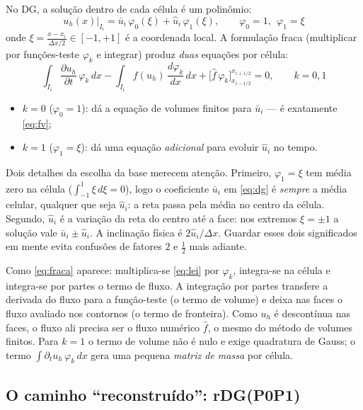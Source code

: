 \documentclass[10pt,a4paper]{article}
\newcommand{\pd}[2]{\frac{\partial #1}{\partial #2}}
\newcommand{\fh}{\hat f}
\newcommand{\ub}{\bar u}
\newcommand{\uh}{\hat u}
\begin{document}
No DG, a solução dentro de cada célula é um polinômio:
\begin{equation}\label{eq:dg}
u_h(x)\big|_{I_i}=\ub_i\,\varphi_0(\xi)+\uh_i\,\varphi_1(\xi),\qquad \varphi_0=1,\ \ \varphi_1=\xi
\end{equation}
onde $\xi=\frac{x-x_i}{\Delta x/2}\in[-1,+1]$ é a coordenada local. A formulação fraca (multiplicar por funções-teste $\varphi_k$ e integrar) produz \emph{duas} equações por célula:
\begin{equation}\label{eq:fraca}
\int_{I_i}\pd{u_h}{t}\,\varphi_k\,dx-\int_{I_i}f(u_h)\,\frac{d\varphi_k}{dx}\,dx+\Big[\fh\,\varphi_k\Big]_{x_{i-1/2}}^{x_{i+1/2}}=0,\qquad k=0,1
\end{equation}
\begin{itemize}[leftmargin=2.5em,itemsep=3pt]
\item $k=0$ ($\varphi_0=1$): dá a equação de volumes finitos para $\ub_i$ --- é exatamente \eqref{eq:fv};
\item $k=1$ ($\varphi_1=\xi$): dá uma equação \emph{adicional} para evoluir $\uh_i$ no tempo.
\end{itemize}

Dois detalhes da escolha da base merecem atenção. Primeiro, $\varphi_1=\xi$ tem média zero na célula ($\int_{-1}^{1}\xi\,d\xi=0$), logo o coeficiente $\ub_i$ em \eqref{eq:dg} é \emph{sempre} a média celular, qualquer que seja $\uh_i$: a reta passa pela média no centro da célula. Segundo, $\uh_i$ é a variação da reta do centro até a face: nos extremos $\xi=\pm1$ a solução vale $\ub_i\pm\uh_i$. A inclinação física é $2\uh_i/\Delta x$. Guardar esses dois significados em mente evita confusões de fatores $2$ e $\tfrac12$ mais adiante.

Como \eqref{eq:fraca} aparece: multiplica-se \eqref{eq:lei} por $\varphi_k$, integra-se na célula e integra-se por partes o termo de fluxo. A integração por partes transfere a derivada do fluxo para a função-teste (o termo de volume) e deixa nas faces o fluxo avaliado nos contornos (o termo de fronteira). Como $u_h$ é descontínua nas faces, o fluxo ali precisa ser o fluxo numérico $\fh$, o mesmo do método de volumes finitos. Para $k=1$ o termo de volume não é nulo e exige quadratura de Gauss; o termo $\int\partial_tu_h\,\varphi_k\,dx$ gera uma pequena \emph{matriz de massa} por célula.

\subsection{O caminho ``reconstruído'': rDG(P0P1)}
\end{document}
